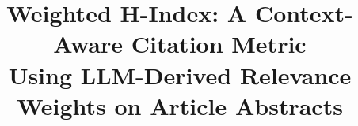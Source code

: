 \documentclass[11pt,letterpaper]{article}
\title{Weighted H-Index: A Context-Aware Citation Metric\\ Using LLM-Derived Relevance Weights on Article Abstracts}
\author{}
\date{}
\begin{document}
\maketitle

\begin{abstract}

\end{abstract}

\tableofcontents
\newpage










\end{document}
